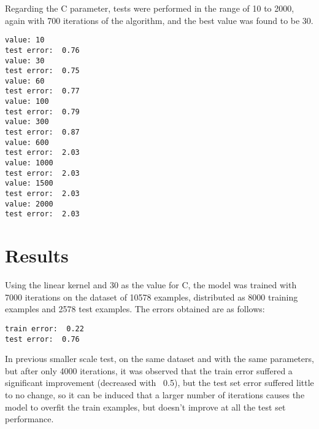 \documentclass[a4paper,10pt]{article}
\begin{document}
Regarding the C parameter, tests were performed in the range of 10 to 2000, again with 700 iterations of the algorithm, and the best value was found to be 30.
\begin{verbatim}
value: 10
test error:  0.76
value: 30
test error:  0.75
value: 60
test error:  0.77
value: 100
test error:  0.79
value: 300
test error:  0.87
value: 600
test error:  2.03
value: 1000
test error:  2.03
value: 1500
test error:  2.03
value: 2000
test error:  2.03
\end{verbatim}

\section{Results}

Using the linear kernel and 30 as the value for C, the model was trained with 7000 iterations on the dataset of 10578 examples, distributed as 8000 training examples and 2578 test examples.
The errors obtained are as follows:
\begin{verbatim}
train error:  0.22
test error:  0.76
\end{verbatim}
In previous smaller scale test, on the same dataset and with the same parameters, but after only 4000 iterations, it was observed that the train error suffered a significant improvement (decreased with ~0.5), but the test set error suffered little to no change, so it can be induced that a larger number of iterations causes the model to overfit the train examples, but doesn't improve at all the test set performance.
\end{document}
